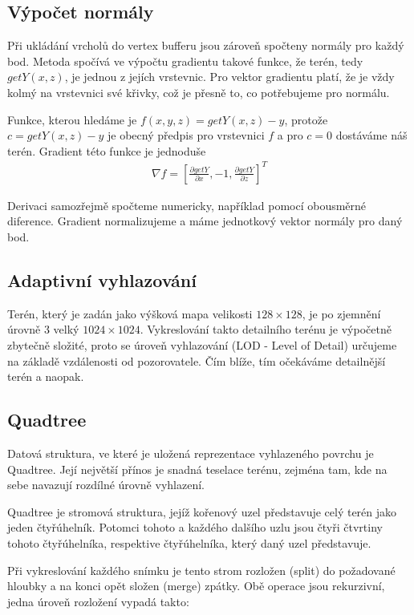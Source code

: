 \documentclass[11pt]{article}
\begin{document}
\subsection{Výpočet normály}
Při ukládání vrcholů do vertex bufferu jsou zároveň spočteny normály pro každý
bod. Metoda spočívá ve výpočtu gradientu takové funkce, že terén, tedy $getY(x,
z)$, je jednou z jejích vrstevnic. Pro vektor gradientu platí, že je vždy kolmý
na vrstevnici své křivky, což je přesně to, co potřebujeme pro normálu.

Funkce, kterou hledáme je $f(x, y, z) = getY(x, z) - y$, protože $c = getY(x,
z) - y$ je obecný předpis pro vrstevnici $f$ a pro $c = 0$ dostáváme náš terén. 
Gradient této funkce je jednoduše
\begin{align*}
\nabla f = \left[ \frac{\partial getY}{\partial x}, -1, \frac{\partial getY}{\partial z} \right]^T
\end{align*}

Derivaci samozřejmě spočteme numericky, například pomocí obousměrné diference.
Gradient normalizujeme a máme jednotkový vektor normály pro daný bod.

\subsection{Adaptivní vyhlazování}
Terén, který je zadán jako výšková mapa velikosti $128\times128$, je po
zjemnění úrovně 3 velký $1024\times1024$. Vykreslování takto detailního terénu
je výpočetně zbytečně složité, proto se úroveň vyhlazování (LOD - Level of
Detail) určujeme na základě vzdálenosti od pozorovatele. Čím blíže, tím
očekáváme detailnější terén a naopak. 

\subsection{Quadtree}
Datová struktura, ve které je uložená reprezentace vyhlazeného povrchu je
Quadtree. Její největší přínos je snadná teselace terénu, zejména tam, kde na
sebe navazují rozdílné úrovně vyhlazení.

Quadtree je stromová struktura, jejíž kořenový uzel představuje celý terén jako
jeden čtyřúhelník. Potomci tohoto a každého dalšího uzlu jsou čtyři čtvrtiny
tohoto čtyřúhelníka, respektive čtyřúhelníka, který daný uzel představuje.

Při vykreslování každého snímku je tento strom rozložen (split) do požadované hloubky a na konci opět složen (merge) zpátky. Obě operace jsou rekurzivní, jedna úroveň rozložení vypadá takto:
\end{document}
